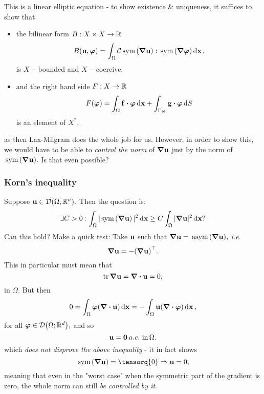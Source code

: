 \documentclass[11pt]{scrartcl} %
\begin{document}
This is a linear elliptic equation - to show existence \& uniqueness, it suffices to show that 
\begin{itemize}
	\item the bilinear form $B: X \times X \to {\mathbb R}$
		\[
			 B\qty(\vb{u}, \vb*{\varphi}) = \int_{\Omega}\mathcal{C}\, \text{sym} \,\qty(\grad \vb{u}) : \, \text{sym} \,\qty(\grad \vb*{\varphi})\dd{\vb{x}},
		\]
		is $X-$bounded and $X-$coercive,
	\item and the right hand side $F:X \to {\mathbb R}$
		\[
			F(\vb*{\varphi}) = \int_{\Omega}\vb{f} \vdot \vb*{\varphi}\dd{\vb{x}} + \int_{\Gamma_N}\vb{g} \vdot \vb*{\varphi}\dd{S}
		\]
		is an element of $X^{*},$
\end{itemize}
as then Lax-Milgram does the whole job for us. However, in order to show this, we would have to be able to \textit{control the norm} of $\grad \vb{u}$ just by the norm of $\, \text{sym} \,\qty(\grad \vb{u}).$ Is that even possible?

\subsubsection{Korn's inequality}
\label{sec:korn}

\begin{example}
	Suppose $\vb{u} \in \mathcal{D}\qty(\Omega; {\mathbb R}^n).$ Then the question is:
	\[
		\exists C>0: \int_{\Omega}|\, \text{sym} \,\qty(\grad \vb{u})|^{2}\dd{\vb{x}} \geq C \int_{\Omega}|\grad \vb{u}|^{2}\dd{\vb{x}}?
	\]
	Can this hold? Make a quick test: Take $\vb{u}$ such that $\grad \vb{u} = \, \text{asym} \,\qty(\grad \vb{u}),$ \textit{i.e.}
	\[
		\grad \vb{u} = - \qty(\grad \vb{u})^\top.
	\]
	This in particular must mean that
	\[
		\tr \grad \vb{u} = \divergence{\vb{u}} = 0,
	\]
	in $\Omega.$ But then
	\[
		0 = \int_{\Omega}\vb*{\varphi}\qty(\divergence{\vb{u}})\dd{\vb{x}} = - \int_{\Omega}\vb{u}\qty(\divergence{\vb*{\varphi}})\dd{\vb{x}},
	\]
	for all $\vb*{\varphi} \in \mathcal{D}\qty(\Omega; {\mathbb R}^{d}),$ and so
	\[
		\vb{u} = \vb{0} \, \text{\textit{a.e.}} \, \, \text{in} \, \Omega.
	\]
	which \textit{does not disprove the above inequality} - it in fact shows
	\[
		\, \text{sym} \,\qty(\grad \vb{u}) = \tensorq{0} \Rightarrow \vb{u} = 0,
	\]
	meaning that even in the "worst case" when the symmetric part of the gradient is zero, the whole norm can still \textit{be controlled by it}.
\end{example}
\end{document}
